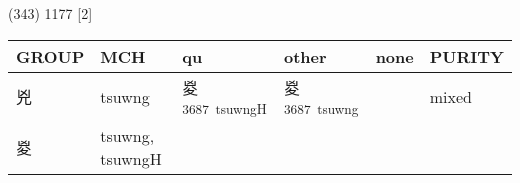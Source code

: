 \documentclass[14pt,a4paper]{scrartcl}
\begin{document}
(343) 1177 {[}2{]}

\begin{longtable}[c]{@{}llllll@{}}
\toprule
\begin{minipage}[b]{0.14\columnwidth}\raggedright\strut
GROUP
\strut\end{minipage} &
\begin{minipage}[b]{0.14\columnwidth}\raggedright\strut
MCH
\strut\end{minipage} &
\begin{minipage}[b]{0.14\columnwidth}\raggedright\strut
qu
\strut\end{minipage} &
\begin{minipage}[b]{0.14\columnwidth}\raggedright\strut
other
\strut\end{minipage} &
\begin{minipage}[b]{0.14\columnwidth}\raggedright\strut
none
\strut\end{minipage} &
\begin{minipage}[b]{0.14\columnwidth}\raggedright\strut
PURITY
\strut\end{minipage}\tabularnewline
\midrule
\endhead
\begin{minipage}[t]{0.14\columnwidth}\raggedright\strut
兇
\strut\end{minipage} &
\begin{minipage}[t]{0.14\columnwidth}\raggedright\strut
tsuwng
\strut\end{minipage} &
\begin{minipage}[t]{0.14\columnwidth}\raggedright\strut
㚇\textsuperscript{3687~tsuwngH}
\strut\end{minipage} &
\begin{minipage}[t]{0.14\columnwidth}\raggedright\strut
㚇\textsuperscript{3687~tsuwng}
\strut\end{minipage} &
\begin{minipage}[t]{0.14\columnwidth}\raggedright\strut
\strut\end{minipage} &
\begin{minipage}[t]{0.14\columnwidth}\raggedright\strut
mixed
\strut\end{minipage}\tabularnewline
\begin{minipage}[t]{0.14\columnwidth}\raggedright\strut
㚇
\strut\end{minipage} &
\begin{minipage}[t]{0.14\columnwidth}\raggedright\strut
tsuwng, tsuwngH
\strut\end{minipage} &
\begin{minipage}[t]{0.14\columnwidth}\raggedright\strut

\end{minipage}
\end{longtable}
\end{document}
